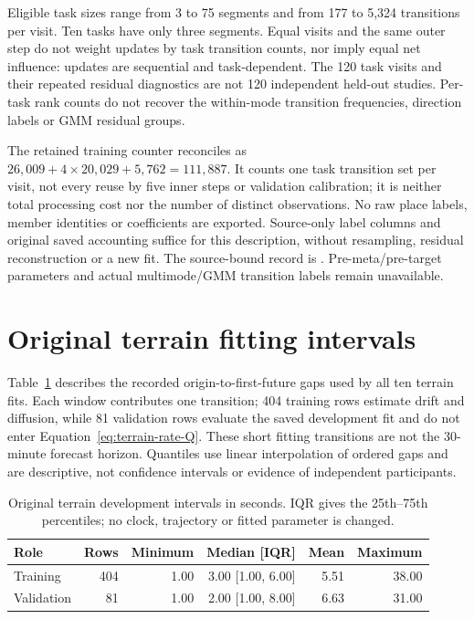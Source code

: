 Eligible task sizes range from 3 to 75 segments and from 177 to 5,324
transitions per visit. Ten tasks have only three segments. Equal visits
and the same outer step do not weight updates by task transition counts,
nor imply equal net influence: updates are sequential and task-dependent.
The 120 task visits and their repeated residual diagnostics are not 120
independent held-out studies. Per-task rank counts do not recover the
within-mode transition frequencies, direction labels or GMM residual groups.

The retained training counter reconciles as
\(26{,}009+4\times20{,}029+5{,}762=111{,}887\).
It counts one task transition set per visit, not every reuse by five inner
steps or validation calibration; it is neither total processing cost nor
the number of distinct observations. No raw place labels, member identities
or coefficients are exported. Source-only label columns and original saved
accounting suffice for this description, without resampling, residual
reconstruction or a new fit. The source-bound record is
. Pre-meta/pre-target
parameters and actual multimode/GMM transition labels remain unavailable.


\section{Original terrain fitting intervals}
\label{sec:terrain-fit-intervals}\hypertarget{sec:terrain-fit-intervals}{}
Table~\ref{tab:terrain-fit-intervals} describes the recorded origin-to-first-future
gaps used by all ten terrain fits. Each window contributes one transition;
404 training rows estimate drift and diffusion, while 81 validation rows
evaluate the saved development fit and do not enter Equation~\eqref{eq:terrain-rate-Q}.
These short fitting transitions are not the 30-minute forecast horizon.
Quantiles use linear interpolation of ordered gaps and are descriptive,
not confidence intervals or evidence of independent participants.

\begin{table}[htbp]
\centering\footnotesize
\caption{Original terrain development intervals in seconds. IQR gives
the 25th--75th percentiles; no clock, trajectory or fitted parameter is changed.}
\label{tab:terrain-fit-intervals}\hypertarget{tab:terrain-fit-intervals}{}
\begin{tabular}{lrrrrr}
\toprule
Role & Rows & Minimum & Median [IQR] & Mean & Maximum\\
\midrule
Training & 404 & 1.00 & 3.00 [1.00, 6.00] & 5.51 & 38.00\\
Validation & 81 & 1.00 & 2.00 [1.00, 8.00] & 6.63 & 31.00\\
\bottomrule
\end{tabular}
\end{table}

